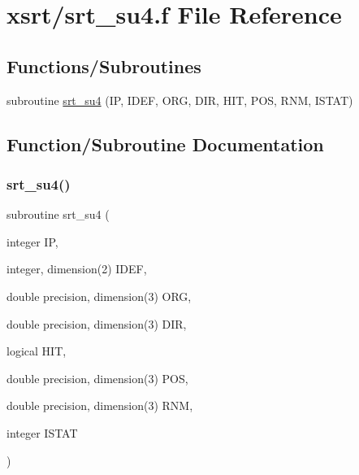 \hypertarget{srt__su4_8f}{}\section{xsrt/srt\+\_\+su4.f File Reference}
\label{srt__su4_8f}
\subsection*{Functions/\+Subroutines}
\begin{DoxyCompactItemize}
\item 
subroutine \hyperlink{srt__su4_8f_ad94e759039782a5317ae4f466adbcd02}{srt\+\_\+su4} (IP, I\+D\+EF, O\+RG, D\+IR, H\+IT, P\+OS, R\+NM, I\+S\+T\+AT)
\end{DoxyCompactItemize}


\subsection{Function/\+Subroutine Documentation}
\mbox{\label{srt__su4_8f_ad94e759039782a5317ae4f466adbcd02}} 
\subsubsection{\texorpdfstring{srt\+\_\+su4()}{srt\_su4()}}
{\footnotesize\ttfamily subroutine srt\+\_\+su4 (\begin{DoxyParamCaption}\item[{integer}]{IP,  }\item[{integer, dimension(2)}]{I\+D\+EF,  }\item[{double precision, dimension(3)}]{O\+RG,  }\item[{double precision, dimension(3)}]{D\+IR,  }\item[{logical}]{H\+IT,  }\item[{double precision, dimension(3)}]{P\+OS,  }\item[{double precision, dimension(3)}]{R\+NM,  }\item[{integer}]{I\+S\+T\+AT }\end{DoxyParamCaption})}

